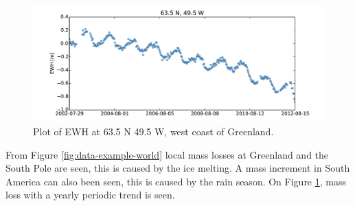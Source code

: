 \begin{figure}[H]
	\centering
	\includegraphics[width=\textwidth]{figures/data-example-scatter}
	\caption{Plot of EWH at 63.5 N 49.5 W, west coast of Greenland.}
	\label{fig:data-example-scatter}
\end{figure}

From Figure \ref{fig:data-example-world} local mass losses at Greenland and the South Pole are seen, this is caused by the ice melting. 
A mass increment in South America can also been seen, this is caused by the rain season.
On Figure \ref{fig:data-example-scatter}, mass loss with a yearly periodic trend is seen.

